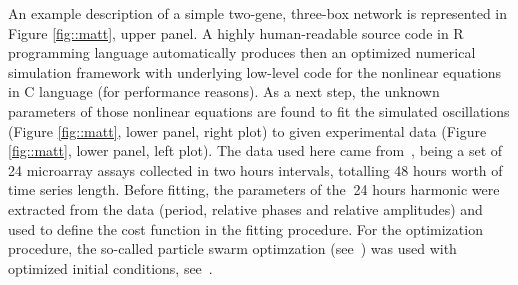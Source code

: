 An example description of a simple two-gene, three-box network is
represented in Figure \ref{fig::matt}, upper panel. A highly
human-readable source code in R programming language automatically
produces then an optimized numerical simulation framework with
underlying low-level code for the nonlinear equations in C language
(for performance reasons). As a next step, the unknown parameters of
those nonlinear equations are found to fit the simulated oscillations
(Figure \ref{fig::matt}, lower panel, right plot) to given
experimental data (Figure \ref{fig::matt}, lower panel, left plot).
The data used here came from~\cite{zhang2014circadian}, being a set of
24 microarray assays collected in two hours intervals, totalling 48
hours worth of time series length. Before fitting, the parameters of
the $~$24 hours harmonic were extracted from the data (period,
relative phases and relative amplitudes) and used to define the cost
function in the fitting procedure. For the optimization procedure, the
so-called particle swarm optimzation (see~\cite{zambrano2012hydropso})
was used with optimized initial conditions,
see~\cite{richards2004choosing}.
